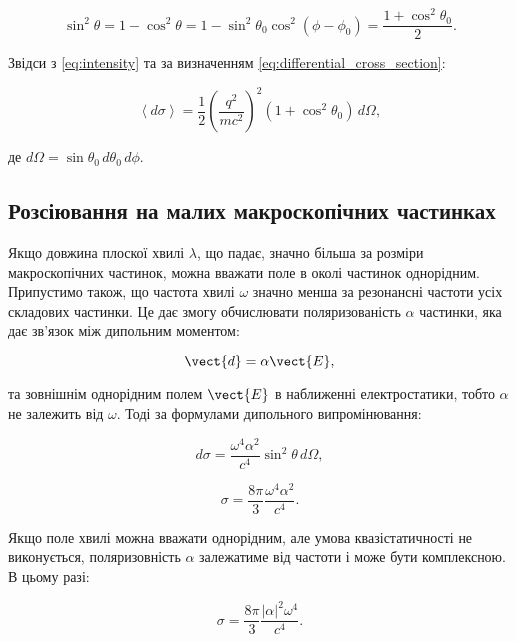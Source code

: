 \begin{equation*}
\sin^2 \theta = 1 - \cos^2 \theta = 1 - \sin^2 \theta_0 \cos^2 (\phi - \phi_0) = \frac{1 + \cos^2 \theta_0}{2}.
\end{equation*}

Звідси з \eqref{eq:intensity} та за визначенням \eqref{eq:differential_cross_section}:

\begin{equation*}
\left\langle d\sigma \right\rangle = \frac{1}{2} \left( \frac{q^2}{mc^2} \right)^2 (1 + \cos^2 \theta_0) \, d\Omega,
\end{equation*}

де \( d\Omega = \sin \theta_0 \, d\theta_0 \, d\phi \).


\subsection*{Розсіювання на малих макроскопічних частинках}

Якщо довжина плоскої хвилі \( \lambda \), що падає, значно більша за розміри макроскопічних частинок, можна вважати поле в околі частинок однорідним.
Припустимо також, що частота хвилі \( \omega \) значно менша за резонансні частоти усіх складових частинки. Це дає змогу обчислювати поляризованість \(
\alpha \) частинки, яка дає зв’язок між дипольним моментом:

\begin{equation}
\vect{d} = \alpha \vect{E},
\label{eq:polarizability}
\end{equation}

та зовнішнім однорідним полем \( \vect{E} \) в наближенні електростатики, тобто \( \alpha \) не залежить від \( \omega \). Тоді за формулами дипольного
випромінювання:

\begin{equation}
d\sigma = \frac{\omega^4 \alpha^2}{c^4} \sin^2 \theta \, d\Omega,
\label{eq:scattering_cross_section}
\end{equation}

\begin{equation}
\sigma = \frac{8\pi}{3} \frac{\omega^4 \alpha^2}{c^4}.
\label{eq:total_scattering_cross_section}
\end{equation}

Якщо поле хвилі можна вважати однорідним, але умова квазістатичності не виконується, поляризовність \( \alpha \) залежатиме від частоти і може бути
комплексною. В цьому разі:

\begin{equation*}
\sigma = \frac{8\pi}{3} \frac{|\alpha|^2 \omega^4}{c^4}.
\end{equation*}